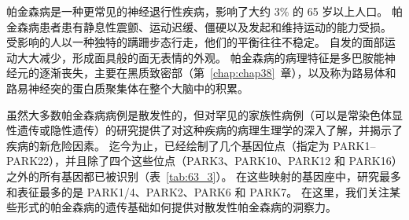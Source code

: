 帕金森病是一种更常见的神经退行性疾病，影响了大约 3\% 的 65 岁以上人口。
帕金森病患者患有静息性震颤、运动迟缓、僵硬以及发起和维持运动的能力受损。
受影响的人以一种独特的蹒跚步态行走，他们的平衡往往不稳定。
自发的面部运动大大减少，形成面具般的面无表情的外观。
帕金森病的病理特征是多巴胺能神经元的逐渐丧失，主要在黑质致密部（第~\ref{chap:chap38}~章），以及称为路易体和路易神经突的蛋白质聚集体在整个大脑中的积累。


虽然大多数帕金森病病例是散发性的，但对罕见的家族性病例（可以是常染色体显性遗传或隐性遗传）的研究提供了对这种疾病的病理生理学的深入了解，并揭示了疾病的新危险因素。
迄今为止，已经绘制了几个基因位点（指定为 PARK1–PARK22），并且除了四个这些位点（PARK3、PARK10、PARK12 和 PARK16）之外的所有基因都已被识别（表~\ref{tab:63_3}）。
在这些映射的基因座中，研究最多和表征最多的是 PARK1/4、PARK2、PARK6 和 PARK7。
在这里，我们关注某些形式的帕金森病的遗传基础如何提供对散发性帕金森病的洞察力。



